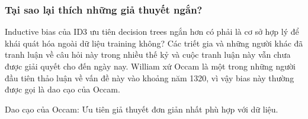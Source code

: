 \subsubsection{Tại sao lại thích những giả thuyết ngắn?}

Inductive bias của ID3 ưu tiên decision trees ngắn hơn có phải là cơ sở hợp lý để khái quát hóa ngoài dữ liệu training không? Các triết gia và những người khác đã tranh luận về câu hỏi này trong nhiều thế kỷ và cuộc tranh luận này vẫn chưa được giải quyết cho đến ngày nay. William xứ Occam là một trong những người đầu tiên thảo luận về vấn đề này vào khoảng năm 1320, vì vậy bias này thường được gọi là dao cạo của Occam.

Dao cạo của Occam: Ưu tiên giả thuyết đơn giản nhất phù hợp với dữ liệu.

